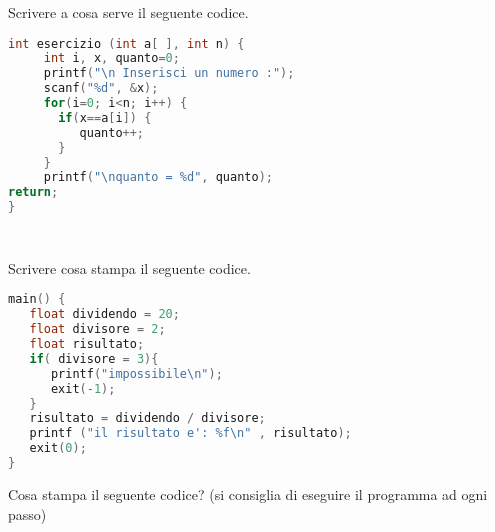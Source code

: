 \documentclass[addpoints,11pt]{exam}
\begin{document}
 \boxedpoints
\begin{center}
\end{center}
 
\vspace{5mm}
 
\noindent{}

\begin{questions} 


\question[2]
Scrivere a cosa serve il seguente codice.

\begin{minipage}[t]{0.5\linewidth}
\begin{lstlisting}[language=C]
int esercizio (int a[ ], int n) {
     int i, x, quanto=0;
     printf("\n Inserisci un numero :");
     scanf("%d", &x);
     for(i=0; i<n; i++) {
       if(x==a[i]) { 
          quanto++;
       }   
     }
     printf("\nquanto = %d", quanto);
return;
}
     
 
\end{lstlisting}
\end{minipage}
\begin{minipage}[t]{0.5\linewidth}
	\makeemptybox{120pt}
\end{minipage}


\question[2]
Scrivere cosa stampa il seguente codice.

\begin{minipage}[t]{0.55\linewidth}
\begin{lstlisting}[language=C]
main() {
   float dividendo = 20;
   float divisore = 2;
   float risultato;
   if( divisore = 3){
      printf("impossibile\n");
      exit(-1);
   }
   risultato = dividendo / divisore;
   printf ("il risultato e': %f\n" , risultato);
   exit(0);
}
\end{lstlisting}
\end{minipage}
\begin{minipage}[t]{0.45\linewidth}
	\makeemptybox{150pt}
\end{minipage}


\question[2]
Cosa stampa il seguente codice? (si consiglia di eseguire il programma ad ogni passo)


\end{questions}
\end{document}
